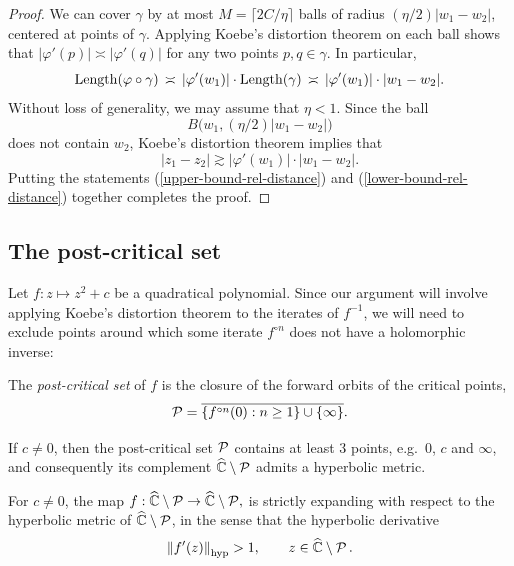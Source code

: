 \begin{proof}
We can cover $\gamma$ by at most $M = \lceil 2C/\eta \rceil$ balls of radius $(\eta/2)|w_1-w_2|$, centered at points of $\gamma$.
Applying Koebe's distortion theorem on each ball shows that
$|\varphi'(p)| \asymp |\varphi'(q)|$ for any two points $p, q \in \gamma$. In particular,
\begin{equation}
\label{upper-bound-rel-distance}
\operatorname{Length}(\varphi \circ \gamma) \, \asymp \, |\varphi'(w_1)| \cdot \operatorname{Length}(\gamma) \, \asymp \, |\varphi'(w_1)| \cdot |w_1 - w_2|.
\end{equation}
Without loss of generality, we may assume that $\eta < 1$. Since the ball $$B \bigl (w_1, (\eta/2) |w_1 - w_2| \bigr )$$ does not contain $w_2$, Koebe's distortion theorem implies that
\begin{equation}
\label{lower-bound-rel-distance}
|z_1-z_2| \gtrsim |\varphi'(w_1)| \cdot |w_1 - w_2|.
\end{equation}
Putting the statements (\ref{upper-bound-rel-distance}) and (\ref{lower-bound-rel-distance}) together completes the proof.
\end{proof}


\subsection{The post-critical set}

Let $f: z\mapsto z^2+c$ be a quadratical polynomial. 
Since our argument will involve applying Koebe's distortion theorem to the iterates of $f^{-1}$, 
we will need to exclude points around which some iterate $f^{\circ n}$ does not have a holomorphic inverse:

\begin{definition}
	The \emph{post-critical set} of $f$ is the closure of the forward orbits 
	of the critical points,
	\begin{equation*}
		\operatorname{\mathcal P} = \overline{\{f^{\circ n} (0): n \geq 1\} \cup \{\infty\}}.
	\end{equation*}	
\end{definition}

If $c \neq 0$, then the post-critical set $\operatorname{\mathcal P}$ contains at least $3$ points, e.g.~$0$, $c$ and $\infty$, and consequently its complement $\widehat{\mathbb C} \setminus \operatorname{\mathcal P}$
admits a hyperbolic metric.

 \begin{theorem}\label{theorem:hyperbolic_expanding}
For $c \neq 0$, the map
$f: \widehat {\mathbb C} \setminus \operatorname{\mathcal P} \to \widehat {\mathbb C} \setminus \operatorname{\mathcal P},$
is strictly expanding with respect to the hyperbolic metric of $\widehat {\mathbb C} \setminus \operatorname{\mathcal P}$, in the sense that the hyperbolic derivative
\begin{equation}\label{eq:hyp-derivative-bound}
	\left\Vert f'(z)\right\Vert_{\operatorname{hyp}} > 1, \qquad z\in \widehat {\mathbb C} \setminus \operatorname{\mathcal P}.
\end{equation}
 \end{theorem}
 
